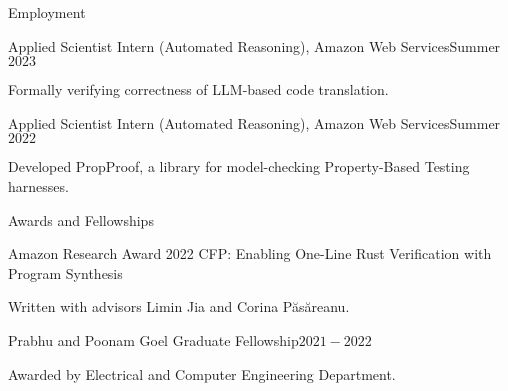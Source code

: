 \documentclass{resume} %
\begin{document}
\begin{rSection}{Employment}

  \begin{rSubsection}{Applied Scientist Intern (Automated Reasoning),
      Amazon Web Services}{Summer $2023$} {}{}
  \item Formally verifying correctness of LLM-based code translation.
  \end{rSubsection}

  \begin{rSubsection}{Applied Scientist Intern (Automated Reasoning),
      Amazon Web Services}{Summer $2022$} {}{}
  \item Developed PropProof, a library for model-checking
    Property-Based Testing harnesses.
  \end{rSubsection}
\end{rSection}


\begin{rSection}{Awards and Fellowships}

  \begin{rSubsection}{Amazon Research Award 2022 CFP: Enabling One-Line Rust
      Verification with Program Synthesis}{}{}{}
  \item Written with advisors Limin Jia and Corina P\u{a}s\u{a}reanu.
  \end{rSubsection}

  \begin{rSubsection}{Prabhu and Poonam Goel Graduate Fellowship}{$2021 - 2022$}{}{}
    \item Awarded by Electrical and Computer Engineering Department.
  \end{rSubsection}
\end{rSection}
\end{document}
